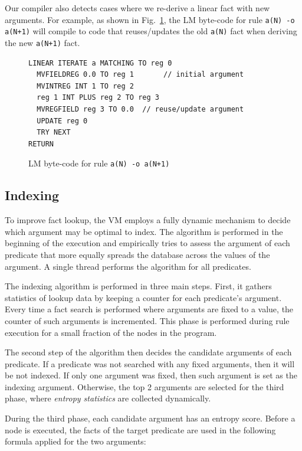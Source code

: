 Our compiler also detects cases where we re-derive a linear fact with
new arguments. For example, as shown in Fig.~\ref{code:update}, the LM
byte-code for rule \texttt{a(N) -o a(N+1)} will compile to code that
reuses/updates the old \texttt{a(N)} fact when deriving the
new \texttt{a(N+1)} fact.

\begin{figure}[ht]
{\footnotesize
\begin{Verbatim}
LINEAR ITERATE a MATCHING TO reg 0
  MVFIELDREG 0.0 TO reg 1       // initial argument
  MVINTREG INT 1 TO reg 2
  reg 1 INT PLUS reg 2 TO reg 3
  MVREGFIELD reg 3 TO 0.0  // reuse/update argument
  UPDATE reg 0
  TRY NEXT
RETURN
\end{Verbatim}
}
\caption{\small{LM byte-code for rule \texttt{a(N) -o a(N+1)}}}
\label{code:update}
\end{figure}


\subsection{Indexing}
\label{indexing}

To improve fact lookup, the VM employs a fully dynamic mechanism to
decide which argument may be optimal to index.  The algorithm is
performed in the beginning of the execution and empirically tries to
assess the argument of each predicate that more equally spreads the
database across the values of the argument.  A single thread performs
the algorithm for all predicates.

The indexing algorithm is performed in three main steps. First, it
gathers statistics of lookup data by keeping a counter for each
predicate's argument.  Every time a fact search is performed where
arguments are fixed to a value, the counter of such arguments is
incremented. This phase is performed during rule execution for a small
fraction of the nodes in the program.

The second step of the algorithm then decides the candidate arguments
of each predicate.  If a predicate was not searched with any fixed
arguments, then it will be not indexed.  If only one argument was
fixed, then such argument is set as the indexing argument. Otherwise,
the top 2 arguments are selected for the third phase,
where \emph{entropy statistics} are collected dynamically.

During the third phase, each candidate argument has an entropy score.
Before a node is executed, the facts of the target predicate
are used in the following formula applied for the two arguments:

